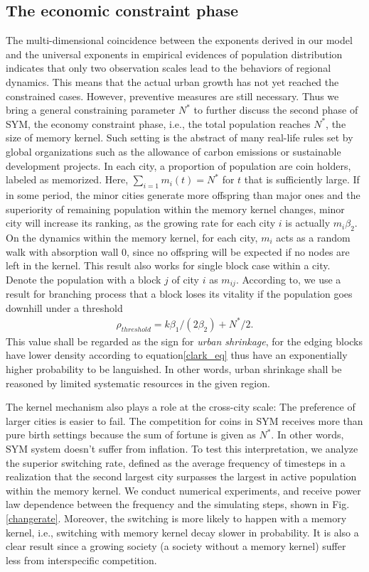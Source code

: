 \documentclass[reprint,unsortedaddress,amsmath,amssymb,aps,prl,showkeys]{revtex4-2}
\begin{document}
\subsection{The economic constraint phase}

The multi-dimensional coincidence between the exponents derived in our model and the universal exponents in empirical evidences of population distribution indicates that only two observation scales lead to the behaviors of regional dynamics. This means that the actual urban growth has not yet reached the constrained cases. However, preventive measures are still necessary. Thus we bring a general constraining parameter $N^*$ to further discuss the second phase of SYM, the economy constraint phase, i.e., the total population reaches $N^*$, the size of memory kernel. Such setting is the abstract of many real-life rules set by global organizations such as the allowance of carbon emissions or sustainable development projects. In each city, a proportion of population are coin holders, labeled as memorized. Here, $\sum_{i=1} m_i(t) = N^*$ for $t$ that is sufficiently large. If in some period, the minor cities generate more offspring than major ones and the superiority of remaining population within the memory kernel changes, minor city will increase its ranking, as the growing rate for each city $i$ is actually $m_i\beta_2$. On the dynamics within the memory kernel, for each city, $m_i$ acts as a random walk with absorption wall $0$, since no offspring will be expected if no nodes are left in the kernel. This result also works for single block case within a city. Denote the population with a block $j$ of city $i$ as $m_{ij}$. According to\@\cite{durrett1999essentials}, we use a result for branching process that a block loses its vitality if the population goes downhill under a threshold \begin{align}\rho_{threshold} = k\beta_1/(2\beta_2)+N^*/2.\end{align} This value shall be regarded as the sign for \emph{urban shrinkage}, for the edging blocks have lower density according to equation\@\ref{clark_eq} thus have an exponentially higher probability to be languished. In other words, urban shrinkage shall be reasoned by limited systematic resources in the given region. 

The kernel mechanism also plays a role at the cross-city scale: The preference of larger cities is easier to fail. The competition for coins in SYM receives more than pure birth settings because the sum of fortune is given as $N^*$. In other words, SYM system doesn't suffer from inflation. To test this interpretation, we analyze the superior switching rate, defined as the average frequency of timesteps in a realization that the second largest city surpasses the largest in active population within the memory kernel. We conduct numerical experiments, and receive power law dependence between the frequency and the simulating steps, shown in Fig.\@\ref{changerate}. Moreover, the switching is more likely to happen with a memory kernel, i.e., switching with memory kernel decay slower in probability. It is also a clear result since a growing society (a society without a memory kernel) suffer less from interspecific competition.
\end{document}
